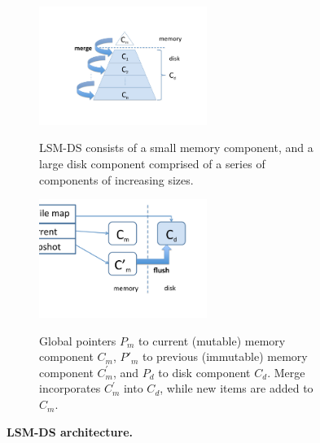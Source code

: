 \begin{figure}
  \centering
  \begin{subfigure}[t]{0.43\textwidth}
   \center
{\includegraphics[width=0.6\textwidth,clip, trim =180 100 125 130]{Figures/triangle.pdf}} \caption{LSM-DS consists of a small memory component, and a large disk component
 comprised of a series of components of increasing sizes.}
               \label{fig:tri}
  \end{subfigure}%
  \hspace{0.1\textwidth}
  \begin{subfigure}[t]{0.43\textwidth}
   \center
{\includegraphics[width=0.6\textwidth,clip, trim =40 100 100 25]{Figures/architecture.pdf}} \caption{Global pointers $P_m$ to current (mutable) memory component
$C_m$, $P'_m$ to previous (immutable) memory component $C_m^{'}$, and $P_d$ to
disk component $C_d$. Merge incorporates  $C_m^{'}$ into $C_d$, while new
items are added to $C_m$.}
               \label{fig:comp}
  \end{subfigure}%
  \caption{\bf LSM-DS architecture.}
\label{fig:architecture}
\end{figure} 